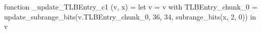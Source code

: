function _update_TLBEntry_c1 (v, x) = let v = { v with TLBEntry_chunk_0 = update_subrange_bits(v.TLBEntry_chunk_0, 36, 34, subrange_bits(x, 2, 0)) } in
  v
